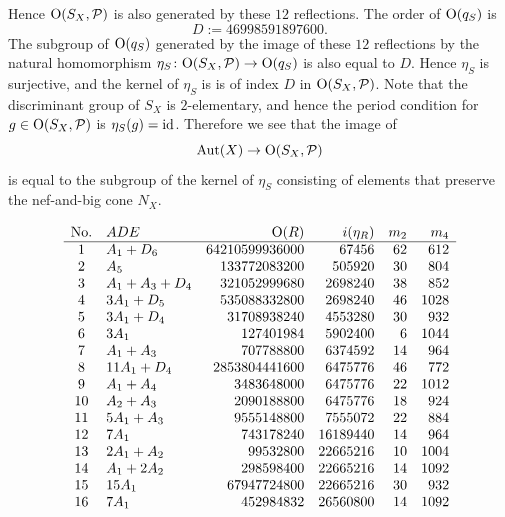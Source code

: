 \documentclass{amsart} %
\begin{document}
%
Hence $\mathord{\mathrm{O}}(S_X, \mathord{\mathcal{P}})$ is also generated  by these $12$ reflections.
The order of $\mathord{\mathrm{O}}(q_S)$  is 
\[
D:=46998591897600.
\]
The subgroup of $\mathord{\mathrm{O}}(q_S)$ generated by the image of these $12$ reflections
by the natural homomorphism $\eta_S\colon \mathord{\mathrm{O}}(S_X, \mathord{\mathcal{P}})\to \mathord{\mathrm{O}}(q_S)$ is also equal to $D$.
Hence $\eta_S$ is surjective,
and the kernel of $\eta_S$ is is of index $D$ in $ \mathord{\mathrm{O}}(S_X, \mathord{\mathcal{P}})$.
Note that the discriminant group of $S_X$ is  $2$-elementary, and hence 
the period condition for $g\in  \mathord{\mathrm{O}}(S_X, \mathord{\mathcal{P}})$ is $\eta_S(g)=\mathord{\mathrm{id}}$.
Therefore we see that the image of
\[
\operatorname{Aut}(X) \to  \mathord{\mathrm{O}}(S_X, \mathord{\mathcal{P}})
\]
is equal to the subgroup of  the kernel of $\eta_S$
consisting of elements that preserve the nef-and-big cone $N_X$.
%
\newpage
%
\begin{table}
\[
\begin{array}{clrrrr}
\textrm{No.} & \textrm{$ADE$} & \mathord{\mathrm{O}}(R) & i(\eta_R) & m_2 & m_4 \\
\hline  
1  &  A_{1}+D_{6}  &  64210599936000  &  67456  &  62  &  612  \\ 
2  &  A_{5}  &  133772083200  &  505920  &  30  &  804  \\ 
3  &  A_{1}+A_{3}+D_{4}  &  321052999680  &  2698240  &  38  &  852  \\ 
4  &  3A_{1}+D_{5}  &  535088332800  &  2698240  &  46  &  1028  \\ 
5  &  3A_{1}+D_{4}  &  31708938240  &  4553280  &  30  &  932  \\ 
6  &  3A_{1}  &  127401984  &  5902400  &  6  &  1044  \\ 
7  &  A_{1}+A_{3}  &  707788800  &  6374592  &  14  &  964  \\ 
8  &  11A_{1}+D_{4}  &  2853804441600  &  6475776  &  46  &  772  \\ 
9  &  A_{1}+A_{4}  &  3483648000  &  6475776  &  22  &  1012  \\ 
10  &  A_{2}+A_{3}  &  2090188800  &  6475776  &  18  &  924  \\ 
11  &  5A_{1}+A_{3}  &  9555148800  &  7555072  &  22  &  884  \\ 
12  &  7A_{1}  &  743178240  &  16189440  &  14  &  964  \\ 
13  &  2A_{1}+A_{2}  &  99532800  &  22665216  &  10  &  1004  \\ 
14  &  A_{1}+2A_{2}  &  298598400  &  22665216  &  14  &  1092  \\ 
15  &  15A_{1}  &  67947724800  &  22665216  &  30  &  932  \\ 
16  &  7A_{1}  &  452984832  &  26560800  &  14  &  1092  \\ 

\end{array}\]
\end{table}
\end{document}
